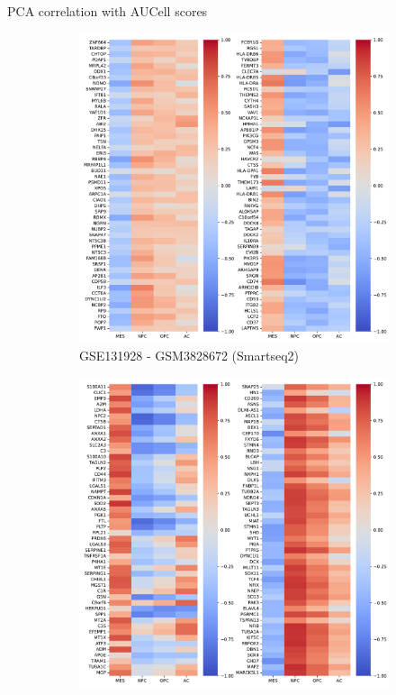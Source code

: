 \documentclass[aspectratio=169,9pt]{beamer}
\begin{document}
    \begin{frame}{PCA correlation with AUCell scores}
        \begin{adjustwidth}{-5cm}{-5cm}
            \centering
            \begin{figure}
                \centering
                \begin{subfigure}[b]{0.38\textwidth}
                    \centering
                    \includegraphics[width=\textwidth]{GSM3828672_load-corr}
                    \caption{GSE131928 - GSM3828672 (Smartseq2)}
                \end{subfigure}
                \begin{subfigure}[b]{0.38\textwidth}
                    \centering
                    \includegraphics[width=\textwidth]{GSM3828673_load-corr}

\end{subfigure}
\end{figure}
\end{adjustwidth}
\end{frame}
\end{document}

